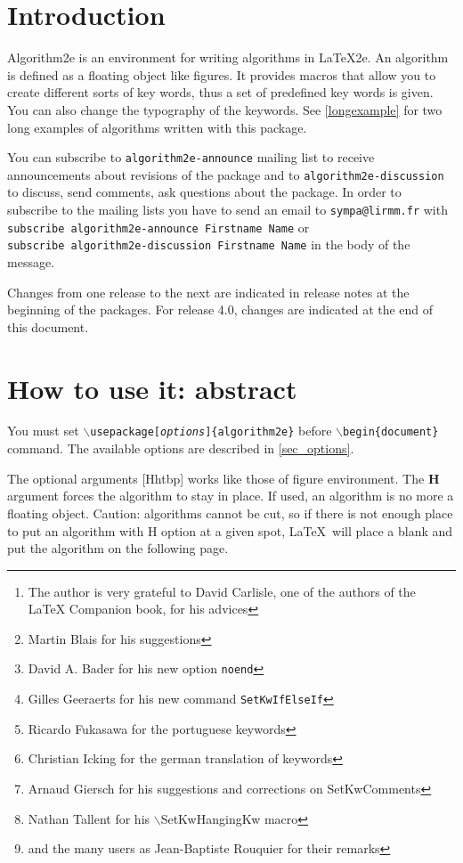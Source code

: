 \documentclass[a4paper]{article}
\author{(c) 1995-1997 Christophe Fiorio, Tu-Berlin, Germany\\
  (c) 1998-2009 Christophe Fiorio, LIRMM, Montpellier 2 University, France\\
  Report bugs and comments to christophe.fiorio@univ-montp2.fr\\
  algorithm2esty-annonce@lirmm.fr mailing list for announcements\\
  algorithm2esty-discussion@lirmm.fr mailing list for discussion\thanks{The author is very grateful to David
    Carlisle, one of the authors of the LaTeX Companion book, for his advices} \thanks{Martin Blais for his
    suggestions} \thanks{David A. Bader for his new option \texttt{noend}} \thanks{Gilles Geeraerts for his new
    command \texttt{SetKwIfElseIf}} \thanks{Ricardo Fukasawa for the portuguese keywords} \thanks{Christian Icking
    for the german translation of keywords} \thanks{Arnaud Giersch for his suggestions and corrections on
    SetKwComments} \thanks{Nathan Tallent for his $\backslash$SetKwHangingKw macro} \thanks{and the many users as
    Jean-Baptiste Rouquier for their remarks} }
\date{december 14 2009}
\begin{document}
\maketitle
\vspace{-0.5cm}

\tableofcontents
\clearpage

\section{Introduction}

Algorithm2e is an environment for writing algorithms in \LaTeX2e{}.  An algorithm is defined as a floating object
like figures.  It provides macros that allow you to create different sorts of key words, thus a set of predefined
key words is given. You can also change the typography of the keywords. See \autoref{longexample} for two long
examples of algorithms written with this package.


You can subscribe to \texttt{algorithm2e-announce} mailing list to receive
announcements about revisions of the package and to
\texttt{algorithm2e-discussion} to discuss, send comments,
ask questions about the package.
\makeatletter
In order to subscribe to the mailing lists you have to send an email to
\texttt{sympa@lirmm.fr} with \texttt{subscribe algorithm2e-announce Firstname
  Name} or\\\texttt{subscribe algorithm2e-discussion Firstname
  Name} in the body of the message.\makeatother

Changes from one release to the next are indicated in release notes at the beginning of the packages. For release
4.0, changes are indicated at the end of this document.

\section{How to use it: abstract}

You must set
\texttt{$\backslash$usepackage[\emph{options}]\{algorithm2e\}} before 
\texttt{$\backslash$begin\{document\}} command. The available options
are described in \autoref{sec_options}.


The optional arguments [Hhtbp] works like those of figure environment.  The
\textbf{H} argument forces the algorithm to stay in place. If used, an algorithm
is no more a floating object.  Caution: algorithms cannot be cut, so if there is
not enough place to put an algorithm with H option at a given spot, \LaTeX\ will
place a blank and put the algorithm on the following page.
\end{document}
